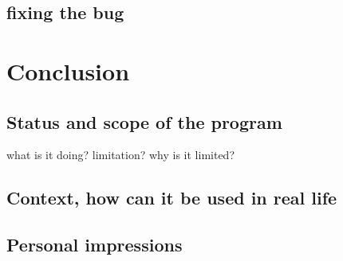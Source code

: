 \documentclass{article}
\begin{document}
\subsection{fixing the bug}

\section{Conclusion}

\subsection{Status and scope of the program}
what is it doing? limitation? why is it limited?

\subsection{Context, how can it be used in real life}
\subsection{Personal impressions}
\end{document}
